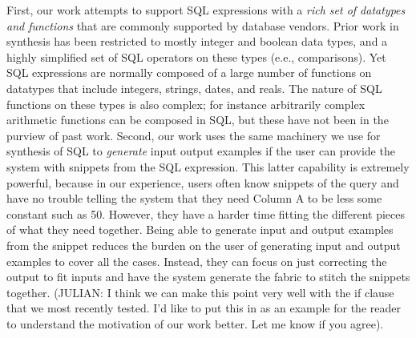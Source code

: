 First, our work attempts to support SQL expressions with a \emph{rich set of datatypes and functions} that are commonly supported by database vendors.  Prior work in synthesis has been restricted to mostly integer and boolean data types, and a highly simplified set of SQL operators on these types (e.e., comparisons).  Yet SQL expressions are normally composed of a large number of functions on datatypes that include integers, strings, dates, and reals.  The nature of SQL functions on these types is also complex; for instance arbitrarily complex arithmetic functions can be composed in SQL, but these have not been in the purview of past work.  Second, our work uses the same machinery we use for synthesis of SQL to \emph{generate} input output examples if the user can provide the system with snippets from the SQL expression.  This latter capability is extremely powerful, because in our experience, users often know snippets of the query and have no trouble telling the system that they need Column A to be less some constant such as 50.  However, they have a harder time fitting the different pieces of what they need together.  Being able to generate input and output examples from the snippet reduces the burden on the user of generating input and output examples to cover all the cases.  Instead, they can focus on just correcting the output to fit inputs and have the system generate the fabric to stitch the snippets together. (JULIAN: I think we can make this point very well with the if clause that we most recently tested.  I'd like to put this in as an example for the reader to understand the motivation of our work better. Let me know if you agree).

  
